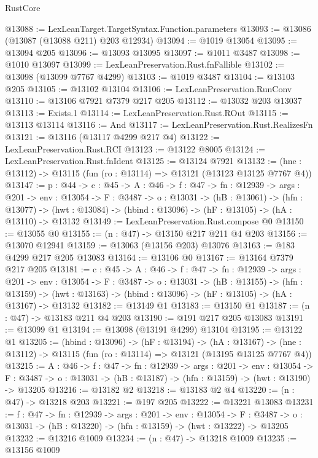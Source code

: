 \begin{lexlean}{RustCore}
\begin{coremodule}
@13088 := LexLeanTarget.TargetSyntax.Function.parameters
@13093 := @13086 (@13087 (@13088 @211) @203 @12934)
@13094 := @1019 @13054
@13095 := @13094 @205
@13096 := @13093 @13095
@13097 := @1011 @3487
@13098 := @1010 @13097
@13099 := LexLeanPreservation.Rust.fnFallible
@13102 := @13098 (@13099 @7767 @4299)
@13103 := @1019 @3487
@13104 := @13103 @205
@13105 := @13102 @13104
@13106 := LexLeanPreservation.RunConv
@13110 := @13106 @7921 @7379 @217 @205
@13112 := @13032 @203 @13037
@13113 := Exists.{1}
@13114 := LexLeanPreservation.Rust.ROut
@13115 := @13113 @13114
@13116 := And
@13117 := LexLeanPreservation.Rust.RealizesFn
@13121 := @13116 (@13117 @4299 @217 @4)
@13122 := LexLeanPreservation.Rust.RCI
@13123 := @13122 @8005
@13124 := LexLeanPreservation.Rust.fnIdent
@13125 := @13124 @7921
@13132 := (hne : @13112) -> @13115 (fun (ro : @13114) => @13121 (@13123 @13125 @7767 @4))
@13147 := {p : @44} ->
  {c : @45} ->
  {A : @46} ->
  {f : @47} ->
  {fn : @12939} ->
  {args : @201} ->
  {env : @13054} ->
  {F : @3487} ->
  {o : @13031} ->
  (hB : @13061) ->
  (hfn : @13077) -> (hwt : @13084) -> (hbind : @13096) -> (hF : @13105) -> (hA : @13110) -> @13132
@13149 := LexLeanPreservation.Rust.compose @0
@13150 := @13055 @0
@13155 := (n : @47) -> @13150 @217 @211 @4 @203
@13156 := @13070 @12941
@13159 := @13063 (@13156 @203) @13076
@13163 := @183 @4299 @217 @205 @13083
@13164 := @13106 @0
@13167 := @13164 @7379 @217 @205
@13181 := {c : @45} ->
  {A : @46} ->
  {f : @47} ->
  {fn : @12939} ->
  {args : @201} ->
  {env : @13054} ->
  {F : @3487} ->
  {o : @13031} ->
  (hB : @13155) ->
  (hfn : @13159) -> (hwt : @13163) -> (hbind : @13096) -> (hF : @13105) -> (hA : @13167) -> @13132
@13182 := @13149 @1
@13183 := @13150 @1
@13187 := (n : @47) -> @13183 @211 @4 @203
@13190 := @191 @217 @205 @13083
@13191 := @13099 @1
@13194 := @13098 (@13191 @4299) @13104
@13195 := @13122 @1
@13205 := (hbind : @13096) ->
  (hF : @13194) ->
  (hA : @13167) -> (hne : @13112) -> @13115 (fun (ro : @13114) => @13121 (@13195 @13125 @7767 @4))
@13215 := {A : @46} ->
  {f : @47} ->
  {fn : @12939} ->
  {args : @201} ->
  {env : @13054} ->
  {F : @3487} -> {o : @13031} -> (hB : @13187) -> (hfn : @13159) -> (hwt : @13190) -> @13205
@13216 := @13182 @2
@13218 := @13183 @2 @4
@13220 := (n : @47) -> @13218 @203
@13221 := @197 @205
@13222 := @13221 @13083
@13231 := {f : @47} ->
  {fn : @12939} ->
  {args : @201} ->
  {env : @13054} ->
  {F : @3487} -> {o : @13031} -> (hB : @13220) -> (hfn : @13159) -> (hwt : @13222) -> @13205
@13232 := @13216 @1009
@13234 := (n : @47) -> @13218 @1009
@13235 := @13156 @1009

\end{coremodule}
\end{lexlean}
